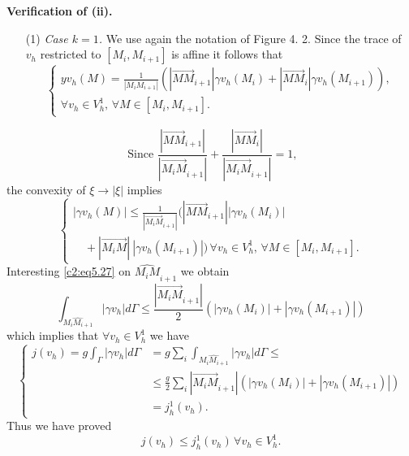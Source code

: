 \medskip
\noindent 
\textbf{Verification of (ii). }%
 \begin{enumerate}
\item [(1)]{\em Case $k = 1$.} We use again the notation of Figure
  4. 2. Since the trace of $v_h$ restricted to $[M_i, M_{i+1}]$ is
  affine it follows that  
\begin{equation}
\begin{cases}
y v_h (M) = \frac{1}{|M_i M_{i + 1}|} (|\overrightarrow{M M}_{i + 1}|
\gamma v_h (M_i) + |\overrightarrow{MM}_i| \gamma v_h (M_{i +1})),\\ 
\forall v_h \in V^1_h,\, \forall  M \in [M_i, M_{i +1}].
\end{cases}
\tag{5.26}\label{c2:eq5.26}
\end{equation}
 \end{enumerate}
 $$
 \text{ Since } \frac{|\overrightarrow{MM}_{i +1}|}{|
   \overrightarrow{M_i M}_{i + 1}|} + \frac{|\overrightarrow{M
     M}_i|}{|\overrightarrow{M_i M}_{i + 1}|} =1 , 
 $$
 the convexity of $\xi \to |\xi|$ implies
 \begin{equation*}
\begin{cases}
|\gamma v_h (M)| \leq \frac{1}{|\overrightarrow{M_i M}_{i + 1}|}
(|\overrightarrow{M M}_{i + 1}||\gamma v_h (M_i)|\\ 
 \quad + |\overrightarrow{M_i M}|~ |\gamma v_h (M_{i+1})|)\, \forall  v_h
 \in V^1_h,\, \forall  M \in [M_i, M_{i+1}]. 
\end{cases}
\tag{5.27}\label{c2:eq5.27}
 \end{equation*} 
 Interesting \eqref{c2:eq5.27} on $\widehat{M_i M}_{i + 1}$ we obtain 
 $$
 \int_{\widehat{M_i M_{i +1}}} | \gamma v_h | d \Gamma \leq \dfrac{
   |\overrightarrow{M_i M}_{i +1}|}{2} (|\gamma v_h (M_i)| + |\gamma
 v_h (M_{i +1})|) 
 $$
 which implies that $\forall v_h \in V^1_h$ we have
 \begin{equation*}
\begin{cases}
j(v_h) = g \int_\Gamma | \gamma v_h | d \Gamma & = g \sum\limits_i
\int_{\widehat{ M_i M_{i +1}}} | \gamma v_h | d \Gamma \leq\\ 
& \leq \frac{g}{2} \sum\limits_i |\overrightarrow{M_i M}_{i + 1}|
(|\gamma v_h (M_i)| + |\gamma v_h (M_{i + 1})|)\\
& = j^1_h (v_h). 
\end{cases}
 \end{equation*}\pageoriginale  
  Thus we have proved 
  \begin{equation}
j(v_h) \leq j^1_h (v_h)\, \forall  v_h \in V^1_h. \tag{5.28}\label{c2:eq5.28} 
  \end{equation}  

